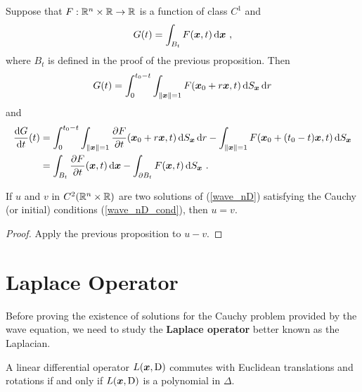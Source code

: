 \begin{rmk}
Suppose that $F:\mathbb{R}^n\times \mathbb{R}\rightarrow \mathbb{R}$ is a function of class
$C^1$ and
\[
G(t) = \int_{B_t} F({\bm{x}},t) \,\mathrm{d}{{\bm{x}}} \  ,
\]
where $B_t$ is defined in the proof of the previous proposition.  Then
\[
G(t) = \int_0^{t_0-t} \int_{\|{\bm{x}}\|=1} F({\bm{x}}_0+r{\bm{x}},t)
\,\mathrm{d}{S}_{{\bm{x}}} \,\mathrm{d}{r}
\]
and
\begin{align*}
\frac{\mathrm{d}G}{\mathrm{d}{t}}(t) &=
\int_0^{t_0-t} \int_{\|{\bm{x}}\|=1} \frac{\partial{F}}{\partial t}({\bm{x}}_0+r{\bm{x}},t)
\,\mathrm{d}{S}_{{\bm{x}}} \,\mathrm{d}{r} -
\int_{\|{\bm{x}}\|=1} F({\bm{x}}_0+(t_0-t){\bm{x}},t)
\,\mathrm{d}{S}_{{\bm{x}}} \\
&= \int_{B_t} \frac{\partial{F}}{\partial t}({\bm{x}},t) \,\mathrm{d}{{\bm{x}}} -
\int_{\partial B_t} F({\bm{x}},t) \,\mathrm{d}{S}_{{\bm{x}}} \ .
\end{align*}
\label{wave_nrgy}
\end{rmk}

\begin{cor}
If $u$ and $v$ in $C^2(\mathbb{R}^n\times \mathbb{R})$ are two solutions of
(\ref{wave_nD}) satisfying the Cauchy (or initial) conditions
(\ref{wave_nD_cond}), then $u=v$.
\end{cor}

\begin{proof}
Apply the previous proposition to $u-v$.
\end{proof}

\section{Laplace Operator} \label{SectWavenDLaplOp}

Before proving the existence of solutions for the Cauchy problem
provided by the wave equation, we need to study the
{\bfseries Laplace operator} better known as
the Laplacian.

\begin{theorem}
A linear differential operator $L({\bm{x}},\operatorname{D})$ commutes with Euclidean
translations and rotations if and only if $L({\bm{x}},\operatorname{D})$ is a
polynomial in $\Delta$.
\end{theorem}

